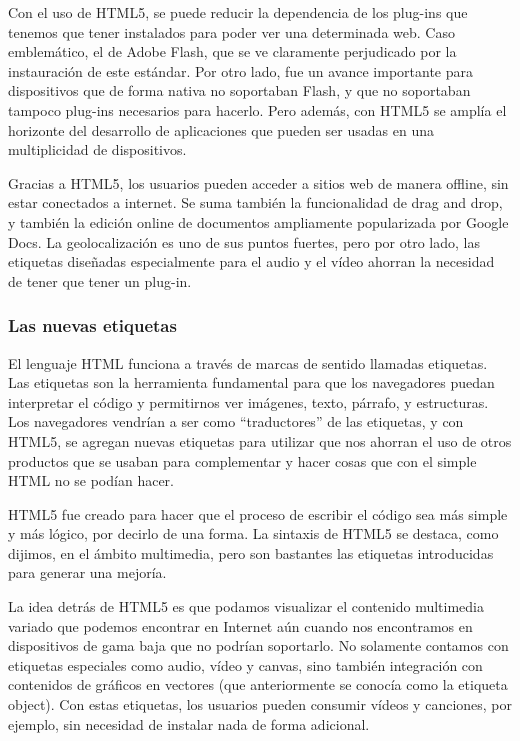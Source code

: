 Con el uso de HTML5, se puede reducir la dependencia de los plug-ins que tenemos que tener instalados para poder ver una determinada web. Caso emblemático, el de Adobe Flash, que se ve claramente perjudicado por la instauración de este estándar. Por otro lado, fue un avance importante para dispositivos que de forma nativa no soportaban Flash, y que no soportaban tampoco plug-ins necesarios para hacerlo. Pero además, con HTML5 se amplía el horizonte del desarrollo de aplicaciones que pueden ser usadas en una multiplicidad de dispositivos.

Gracias a HTML5, los usuarios pueden acceder a sitios web de manera offline, sin estar conectados a internet. Se suma también la funcionalidad de drag and drop, y también la edición online de documentos ampliamente popularizada por Google Docs. La geolocalización es uno de sus puntos fuertes, pero por otro lado, las etiquetas diseñadas especialmente para el audio y el vídeo ahorran la necesidad de tener que tener un plug-in.

\subsubsection{Las nuevas etiquetas}
El lenguaje HTML funciona a través de marcas de sentido llamadas etiquetas. Las etiquetas son la herramienta fundamental para que los navegadores puedan interpretar el código y permitirnos ver imágenes, texto, párrafo, y estructuras. Los navegadores vendrían a ser como “traductores” de las etiquetas, y con HTML5, se agregan nuevas etiquetas para utilizar que nos ahorran el uso de otros productos que se usaban para complementar y hacer cosas que con el simple HTML no se podían hacer. 

HTML5 fue creado para hacer que el proceso de escribir el código sea más simple y más lógico, por decirlo de una forma. La sintaxis de HTML5 se destaca, como dijimos, en el ámbito multimedia, pero son bastantes las etiquetas introducidas para generar una mejoría.

La idea detrás de HTML5 es que podamos visualizar el contenido multimedia variado que podemos encontrar en Internet aún cuando nos encontramos en dispositivos de gama baja que no podrían soportarlo. No solamente contamos con etiquetas especiales como audio, vídeo y canvas, sino también integración con contenidos de gráficos en vectores (que anteriormente se conocía como la etiqueta object). Con estas etiquetas, los usuarios pueden consumir vídeos y canciones, por ejemplo, sin necesidad de instalar nada de forma adicional.

